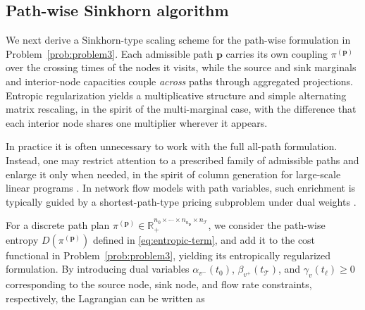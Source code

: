 \documentclass[11pt]{article}
\newcommand{\calT}{{\mathcal T}}
\newcommand{\bp}{{\mathbf p}}
\begin{document}
\subsection{Path-wise Sinkhorn algorithm}\label{sec:path-sinkhorn}
We next derive a Sinkhorn-type scaling scheme for the path-wise formulation in Problem~\ref{prob:problem3}. Each admissible path $\bp$ carries its own coupling $\pi^{(\bp)}$ over the crossing times of the nodes it visits, while the source and sink marginals and interior-node capacities couple \emph{across} paths through aggregated projections. Entropic regularization yields a multiplicative structure and simple alternating matrix rescaling, in the spirit of the multi-marginal case, with the difference that each interior node shares one multiplier wherever it appears.

In practice it is often unnecessary to work with the full all-path formulation. Instead, one may restrict attention to a prescribed family of admissible paths and enlarge it only when needed, in the spirit of column generation for large-scale linear programs \cite{friesecke2022genetic,nemhauser2012column}. In network flow models with path variables, such enrichment is typically guided by a shortest-path-type pricing subproblem under dual weights \cite{engineer2008shortest,moradi2015bi}.

For a discrete path plan $\pi^{(\bp)} \in \mathbb{R}_+^{n_0 \times \cdots \times n_{n_\bp} \times n_{\calT}}$, we consider the path-wise entropy $D(\pi^{(\bp)})$ defined in \eqref{eq:entropic-term}, and add it to the cost functional in Problem~\ref{prob:problem3}, yielding its entropically regularized formulation. By introducing dual variables $\alpha_{v^-}(t_0)$, $\beta_{v^+}(t_{\calT})$, and $\gamma_{v}(t_\ell)\ge 0$ corresponding to the source node, sink node, and flow rate constraints, respectively, the Lagrangian can be written as

\end{document}
